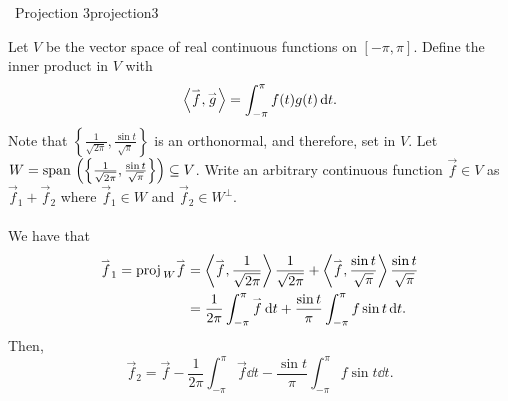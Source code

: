         \begin{example}{\Difficulty\,\Difficulty\,\,Projection 3}{projection3}

            Let \(V\) be the vector space of real continuous functions on \([-\pi,\pi]\). Define the inner product in \(V\) with
            \begin{equation*}
                \left\langle \overset{_{\rightharpoonup}}{f},\overset{_{\rightharpoonup}}{g}\right\rangle=\int_{-\pi}^\pi f(t)g(t) \,\text{d} t.
            \end{equation*}
            Note that \(\left\{\frac{1}{\sqrt{2\pi}},\frac{\sin t}{\sqrt{\pi}}\right\}\) is an orthonormal, and therefore, set in \(V\). Let \(W=\text{span\,}\left(\left\{\frac{1}{\sqrt{2\pi}},\frac{\sin t}{\sqrt{\pi}}\right\}\right)\subseteq V\). Write an arbitrary continuous function \(\vec{f}\in V\) as \(\vec{f}_1+\vec{f}_2\) where \(\vec{f}_1\in W\) and \(\vec{f}_2\in W^\perp\).
            \\
            \\
            We have that
            \begin{align*}
                \overset{_{\rightharpoonup}}{f}_1=\text{proj\,}_W\overset{_{\rightharpoonup}}{f}&=\left\langle \overset{_{\rightharpoonup}}{f},\frac{1}{\sqrt{2\pi}}\right\rangle\frac{1}{\sqrt{2\pi}}+\left\langle \overset{_{\rightharpoonup}}{f},\frac{\sin t}{\sqrt{\pi}}\right\rangle\frac{\sin t}{\sqrt{\pi}} \\
                &=\frac{1}{2\pi}\int_{-\pi}^\pi \overset{_{\rightharpoonup}}{f}\,\text{d} t+\frac{\sin t}{\pi}\int_{-\pi}^\pi f\sin t \,\text{d} t.
            \end{align*}
            Then,
            \begin{equation*}
                \vec{f}_2=\vec{f}-\frac{1}{2\pi}\int_{-\pi}^\pi \vec{f}\dd t-\frac{\sin t}{\pi}\int_{-\pi}^\pi f\sin t \dd t.
            \end{equation*}
        \end{example}